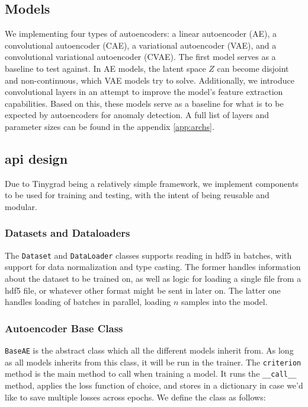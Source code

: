 \subsection{Models} 

We implementing four types of autoencoders: a linear autoencoder (AE), a convolutional autoencoder (CAE), a variational autoencoder (VAE), and a convolutional variational autoencoder (CVAE). The first model serves as a baseline to test against. In AE models, the latent space $Z$ can become disjoint and non-continuous, which VAE models try to solve. Additionally, we introduce convolutional layers in an attempt to improve the model's feature extraction capabilities. Based on this, these models serve as a baseline for what is to be expected by autoencoders for anomaly detection. A full list of layers and parameter sizes can be found in the appendix \ref{app:archs}. \\

\subsection{\acrshort{api} design}

Due to Tinygrad being a relatively simple framework, we implement components to be used for training and testing, with the intent of being reusable and modular.

\subsubsection{Datasets and Dataloaders}

The \texttt{Dataset} and \texttt{DataLoader} classes supports reading in \acrshort{hdf5} in batches, with support for data normalization and type casting. The former handles information about the dataset to be trained on, as well as logic for loading a single file from a \acrshort{hdf5} file, or whatever other format might be sent in later on. The latter one handles loading of batches in parallel, loading $n$ samples into the model.

\subsubsection{Autoencoder Base Class}

\lstinline{BaseAE} is the abstract class which all the different models inherit from. As long as all models inherits from this class, it will be run in the trainer. The \lstinline{criterion} method is the main method to call when training a model. It runs the \lstinline{__call__} method, applies the loss function of choice, and stores in a dictionary in case we'd like to save multiple losses across epochs. We define the class as follows:

